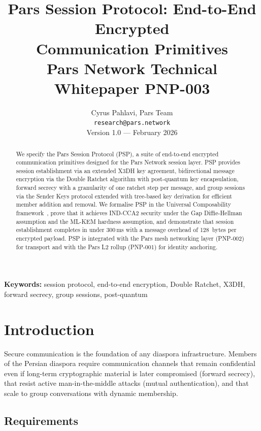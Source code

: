 \documentclass[11pt,a4paper]{article}
\title{%
    \textbf{Pars Session Protocol: End-to-End Encrypted\\
    Communication Primitives}\\[0.5em]
    \large Pars Network Technical Whitepaper PNP-003
}
\author{%
    Cyrus Pahlavi, Pars Team\\
    \texttt{research@pars.network}\\[0.5em]
    \small Version 1.0 --- February 2026
}
\date{}
\begin{document}
\parscoverpage

\thispagestyle{fancy}

\begin{abstract}
\noindent
We specify the Pars Session Protocol (PSP), a suite of end-to-end encrypted
communication primitives designed for the Pars Network session layer.  PSP
provides session establishment via an extended X3DH key agreement,
bidirectional message encryption via the Double Ratchet algorithm with
post-quantum key encapsulation, forward secrecy with a granularity of one
ratchet step per message, and group sessions via the Sender Keys protocol
extended with tree-based key derivation for efficient member addition and
removal.  We formalise PSP in the Universal Composability
framework~\cite{canetti2001universally}, prove that it achieves
IND-CCA2 security under the Gap Diffie-Hellman assumption and the
ML-KEM hardness assumption, and demonstrate that session establishment
completes in under 300\,ms with a message overhead of 128~bytes per
encrypted payload.  PSP is integrated with the Pars mesh networking
layer (PNP-002) for transport and with the Pars L2 rollup (PNP-001)
for identity anchoring.
\end{abstract}

\vspace{1em}
\noindent\textbf{Keywords:} session protocol, end-to-end encryption,
Double Ratchet, X3DH, forward secrecy, group sessions, post-quantum

\tableofcontents
\newpage

\section{Introduction}
\label{sec:introduction}

Secure communication is the foundation of any diaspora infrastructure.
Members of the Persian diaspora require communication channels that remain
confidential even if long-term cryptographic material is later compromised
(forward secrecy), that resist active man-in-the-middle attacks (mutual
authentication), and that scale to group conversations with dynamic
membership.

\subsection{Requirements}
\end{document}

